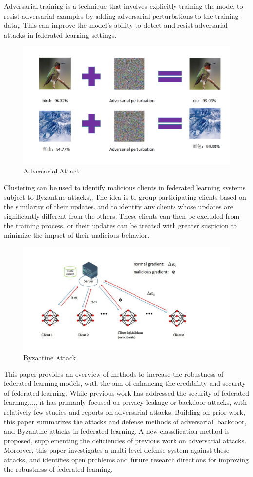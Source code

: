\documentclass[conference]{IEEEtran}
\begin{document}
Adversarial training is a technique that involves explicitly training the model to resist adversarial examples
by adding adversarial perturbations to the training data\cite{b31},\cite{b32}.
This can improve the model's ability to detect and resist adversarial attacks in federated learning settings.
\begin{figure}[htbp]
    \centerline{\includegraphics[width=0.8\linewidth,height=0.4\linewidth]{picture/f2.png}}
    \caption{Adversarial Attack}
    \label{fig4}
\end{figure}
Clustering can be used to identify malicious clients in federated learning systems subject to Byzantine attacks\cite{b35},\cite{b36}.
The idea is to group participating clients based on the similarity of their updates, and to identify any clients whose updates are significantly different from the others.
These clients can then be excluded from the training process, or their updates can be treated with greater suspicion to minimize the impact of their malicious behavior\cite{b37}.
\begin{figure}[htbp]
    \centerline{\includegraphics[width=0.8\linewidth,height=0.4\linewidth]{picture/f5.jpg}}
    \caption{Byzantine Attack}
    \label{fig5}
\end{figure}
This paper provides an overview of methods to increase the robustness of federated learning models, with the aim of enhancing the credibility and security of federated learning.
While previous work has addressed the security of federated learning\cite{b39},\cite{b40},\cite{b41},\cite{b42},\cite{b43}, it has primarily focused on privacy leakage or backdoor attacks,
with relatively few studies and reports on adversarial attacks. Building on prior work, this paper summarizes the attacks and defense methods of adversarial, backdoor,
and Byzantine attacks in federated learning. A new classification method is proposed, supplementing the deficiencies of previous work on adversarial attacks.
Moreover, this paper investigates a multi-level defense system against these attacks, and identifies open problems and future research directions for improving
the robustness of federated learning.
\end{document}
